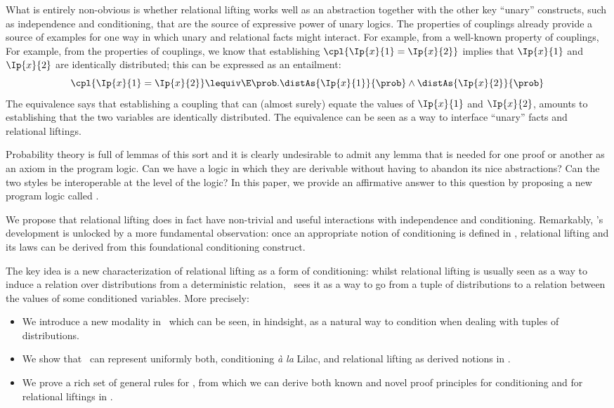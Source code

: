 What is entirely non-obvious is whether relational lifting
works well as an abstraction together with the other key ``unary'' constructs,
such as independence and conditioning,
that are the source of expressive power of unary logics.
\ifappendix The properties of couplings already provide a source of examples
for one way in which unary and relational facts might interact.
For example, from a well-known property of couplings,
\else
For example, from the properties of couplings,
\fi we know that establishing $\cpl{\Ip{x}{1} = \Ip{x}{2}}$ implies that
$\Ip{x}{1}$ and $\Ip{x}{2}$ are identically distributed;
this can be expressed as an entailment:
\begin{equation}
  \cpl{\Ip{x}{1} = \Ip{x}{2}}
  \lequiv
  \E \prob.
    \distAs{\Ip{x}{1}}{\prob}
    \land
    \distAs{\Ip{x}{2}}{\prob}
  \label{eq:rl-id-conv}
\end{equation}
The equivalence says that establishing a coupling that can
(almost surely) equate the values of $\Ip{x}{1}$ and $\Ip{x}{2}$,
amounts to establishing that the two variables are identically distributed.
The equivalence can be seen as a way to interface ``unary'' facts
and relational liftings.


Probability theory is full of lemmas of this sort and it is clearly undesirable to admit any lemma that is needed for one proof or another as an axiom in the program logic.
Can we have a logic in which they are derivable without having to abandon its nice abstractions?
Can the two styles be interoperable at the level of the logic?
In this paper, we provide an affirmative answer to this question by proposing a new program logic called \thelogic.


We propose that relational lifting does in fact have non-trivial and useful
interactions with independence and conditioning.
Remarkably, \thelogic's development is unlocked by
a more fundamental observation:
once an appropriate notion of conditioning is defined in \thelogic,
relational lifting and its laws can be derived from this foundational
conditioning construct.


The key idea is a new characterization of relational lifting as a form of
conditioning:
whilst relational lifting is usually seen as a way to induce a relation over distributions from a deterministic relation,
\thelogic\ sees it as a way to go from
a tuple of distributions to a relation between the values of some conditioned variables.
More precisely:
\begin{itemize}
  \item
    We introduce a new \emph{\supercond} modality in \thelogic\
    which can be seen, in hindsight,
    as a natural way to condition when dealing with tuples of distributions.
  \item
    We show that \supercond\ can represent uniformly
    both, conditioning \emph{à la} Lilac,
    and relational lifting as derived notions in \thelogic.
  \item
    We prove a rich set of general rules for \supercond,
    from which we can derive both known and novel proof principles
    for conditioning and for relational liftings in \thelogic.
\end{itemize}

